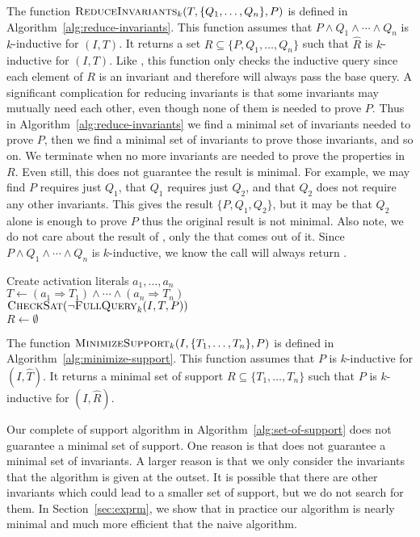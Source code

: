 The function $\textsc{ReduceInvariants}_k(T, \{Q_1, \ldots, Q_n\}, P)$ is defined in
Algorithm~\ref{alg:reduce-invariants}. This function assumes that $P
\land Q_1 \land \cdots \land Q_n$ is $k$-inductive for $(I, T)$. It
returns a set $R \subseteq \{P, Q_1, \ldots, Q_n\}$ such that
$\widehat R$ is $k$-inductive for $(I, T)$. Like \mink, this function
only checks the inductive query since each element of $R$ is an
invariant and therefore will always pass the base query. A significant
complication for reducing invariants is that some invariants may
mutually need each other, even though none of them is needed to prove
$P$. Thus in Algorithm~\ref{alg:reduce-invariants} we find a minimal
set of invariants needed to prove $P$, then we find a minimal set of
invariants to prove those invariants, and so on. We terminate when no
more invariants are needed to prove the properties in $R$. Even still,
this does not guarantee the result is minimal. For example, we may
find $P$ requires just $Q_1$, that $Q_1$ requires just $Q_2$, and that
$Q_2$ does not require any other invariants. This gives the result
$\{P, Q_1, Q_2\}$, but it may be that $Q_2$ alone is enough to prove
$P$ thus the original result is not minimal. Also note, we do not care
about the result of \checksat, only the \unsatcore that comes out of
it. Since $P \land Q_1 \land \cdots \land Q_n$ is $k$-inductive, we
know the \checksat call will always return \unsat.

\begin{algorithm}[t]
  Create activation literals $a_1, \ldots, a_n$ \\
  $T \leftarrow (a_1 \Rightarrow T_1) \land \cdots \land (a_n \Rightarrow T_n)$ \\
  $\textsc{CheckSat}(\neg\textsc{FullQuery}_k(I, T, P))$ \\
  $R \leftarrow \emptyset$ \\
\caption{$\minsupport_k(I, \{T_1, \ldots, T_n\}, P)$}
\label{alg:minimize-support}
\end{algorithm}

The function $\minsupport_k(I, \{T_1, \ldots, T_n\}, P)$ is defined in
Algorithm~\ref{alg:minimize-support}. This function assumes that $P$
is $k$-inductive for $(I, \widehat T)$. It returns a minimal set of
support $R \subseteq \{T_1, \ldots, T_n\}$ such that $P$ is
$k$-inductive for $(I, \widehat R)$.

Our complete of support algorithm in
Algorithm~\ref{alg:set-of-support} does not guarantee a minimal set of
support. One reason is that \reduceinv does not guarantee a minimal
set of invariants. A larger reason is that we only consider the
invariants that the algorithm is given at the outset. It is possible
that there are other invariants which could lead to a smaller set of
support, but we do not search for them. In Section~\ref{sec:exprm}, we
show that in practice our algorithm is nearly minimal and much more
efficient that the naive algorithm.


